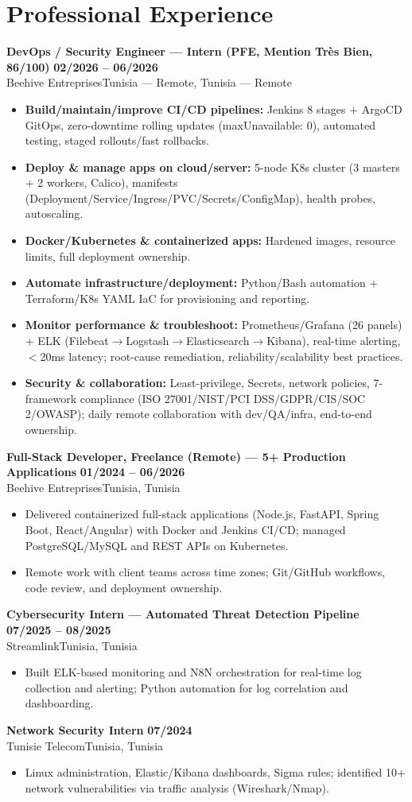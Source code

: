 \documentclass[a4paper,9pt]{article}
\newcommand{\cventry}[4]{\textbf{#1} \hfill \textbf{#4}\\[0.3pt]#2{\ifx\relax#3\relax\else, #3\fi}\par\vspace{0.8pt}}
\begin{document}
\section{Professional Experience}
\cventry{DevOps / Security Engineer --- Intern (PFE, Mention Très Bien, 86/100)}{Beehive Entreprises}{Tunisia — Remote}{02/2026 -- 06/2026}
\begin{itemize}
  \item \textbf{Build/maintain/improve CI/CD pipelines:} Jenkins 8 stages + ArgoCD GitOps, zero-downtime rolling updates (maxUnavailable: 0), automated testing, staged rollouts/fast rollbacks.
  \item \textbf{Deploy \& manage apps on cloud/server:} 5-node K8s cluster (3 masters + 2 workers, Calico), manifests (Deployment/Service/Ingress/PVC/Secrets/ConfigMap), health probes, autoscaling.
  \item \textbf{Docker/Kubernetes \& containerized apps:} Hardened images, resource limits, full deployment ownership.
  \item \textbf{Automate infrastructure/deployment:} Python/Bash automation + Terraform/K8s YAML IaC for provisioning and reporting.
  \item \textbf{Monitor performance \& troubleshoot:} Prometheus/Grafana (26 panels) + ELK (Filebeat$\to$Logstash$\to$Elasticsearch$\to$Kibana), real-time alerting, $<$20ms latency; root-cause remediation, reliability/scalability best practices.
  \item \textbf{Security \& collaboration:} Least-privilege, Secrets, network policies, 7-framework compliance (ISO 27001/NIST/PCI DSS/GDPR/CIS/SOC 2/OWASP); daily remote collaboration with dev/QA/infra, end-to-end ownership.
\end{itemize}
\cventry{Full-Stack Developer, Freelance (Remote) --- 5+ Production Applications}{Beehive Entreprises}{Tunisia}{01/2024 -- 06/2026}
\begin{itemize}
  \item Delivered containerized full-stack applications (Node.js, FastAPI, Spring Boot, React/Angular) with Docker and Jenkins CI/CD; managed PostgreSQL/MySQL and REST APIs on Kubernetes.
  \item Remote work with client teams across time zones; Git/GitHub workflows, code review, and deployment ownership.
\end{itemize}
\cventry{Cybersecurity Intern --- Automated Threat Detection Pipeline}{Streamlink}{Tunisia}{07/2025 -- 08/2025}
\begin{itemize}
  \item Built ELK-based monitoring and N8N orchestration for real-time log collection and alerting; Python automation for log correlation and dashboarding.
\end{itemize}
\cventry{Network Security Intern}{Tunisie Telecom}{Tunisia}{07/2024}
\begin{itemize}
  \item Linux administration, Elastic/Kibana dashboards, Sigma rules; identified 10+ network vulnerabilities via traffic analysis (Wireshark/Nmap).
\end{itemize}
\end{document}

